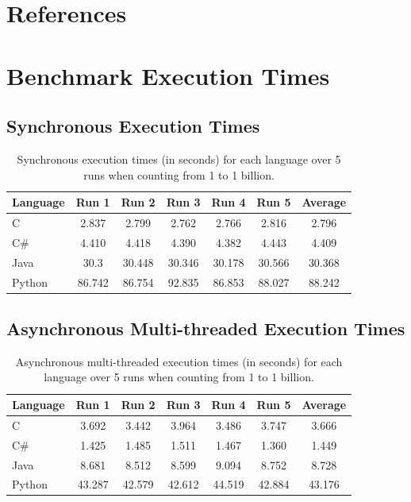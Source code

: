 \documentclass[12pt,a4paper]{article}
\begin{document}
\clearpage
\section{References}
\printbibliography

\clearpage
\appendix
\section{Benchmark Execution Times}

\subsection{Synchronous Execution Times}

\begin{table}[H]
    \centering
    \begin{tabular}{|l|c|c|c|c|c|c|}
        \hline
        \textbf{Language} & \textbf{Run 1} & \textbf{Run 2} & \textbf{Run 3} & \textbf{Run 4} & \textbf{Run 5} & \textbf{Average} \\
        \hline
        C & 2.837 & 2.799 & 2.762 & 2.766 & 2.816 & 2.796 \\
        C\# & 4.410 & 4.418 & 4.390 & 4.382 & 4.443 & 4.409 \\
        Java & 30.3 & 30.448 & 30.346 & 30.178 & 30.566 & 30.368 \\
        Python & 86.742 & 86.754 & 92.835 & 86.853 & 88.027 & 88.242 \\
        \hline
    \end{tabular}
    \caption{Synchronous execution times (in seconds) for each language over 5 runs when counting from 1 to 1 billion.}
    \label{tab:sync-exec-times}
\end{table}

\subsection{Asynchronous Multi-threaded Execution Times}

\begin{table}[H]
    \centering
    \begin{tabular}{|l|c|c|c|c|c|c|}
        \hline
        \textbf{Language} & \textbf{Run 1} & \textbf{Run 2} & \textbf{Run 3} & \textbf{Run 4} & \textbf{Run 5} & \textbf{Average} \\
        \hline
        C & 3.692 & 3.442 & 3.964 & 3.486 & 3.747 & 3.666 \\
        C\# & 1.425 & 1.485 & 1.511 & 1.467 & 1.360 & 1.449 \\
        Java & 8.681 & 8.512 & 8.599 & 9.094 & 8.752 & 8.728 \\
        Python & 43.287 & 42.579 & 42.612 & 44.519 & 42.884 & 43.176 \\
        \hline
    \end{tabular}
    \caption{Asynchronous multi-threaded execution times (in seconds) for each language over 5 runs when counting from 1 to 1 billion.}
    \label{tab:async-exec-times}
\end{table}
\end{document}
